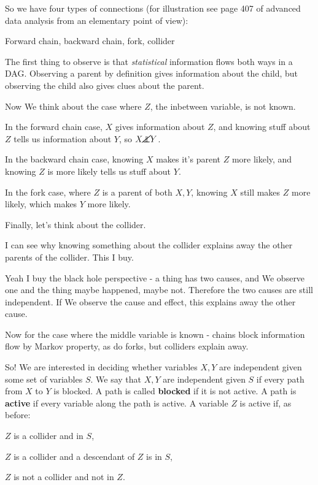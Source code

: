 \documentclass{article}
\newcommand\independent{\protect\mathpalette{\protect\independenT}{\perp}}
\def\independenT#1#2{\mathrel{\rlap{$#1#2$}\mkern2mu{#1#2}}}
\begin{document}
		So we have four types of connections (for illustration see page 407 of advanced data analysis from an elementary point of view):
		
		Forward chain, backward chain, fork, collider
		
		The first thing to observe is that \textit{statistical} information flows both ways in a DAG. Observing a parent by definition gives information about the child, but observing the child also gives clues about the parent.
		
		Now We think about the case where $Z$, the inbetween variable, is not known.
		
		In the forward chain case, $X$ gives information about $Z$, and knowing stuff about $Z$ tells us information about $Y$, so $X \cancel{\independent} Y$.
		
		In the backward chain case, knowing $X$ makes it's parent $Z$ more likely, and knowing $Z$ is more likely tells us stuff about $Y$.
		
		In the fork case, where $Z$ is a parent of both $X, Y$, knowing $X$ still makes $Z$ more likely, which makes $Y$ more likely.
		
		 Finally, let's think about the collider. 
		 
		 I can see why knowing something about the collider explains away the other parents of the collider. This I buy.
		 
		 Yeah I buy the black hole perspective - a thing has two causes, and We observe one and the thing maybe happened, maybe not. Therefore the two causes are still independent. If We observe the cause and effect, this explains away the other cause. 
		 
		 Now for the case where the middle variable is known - chains block information flow by Markov property, as do forks, but colliders explain away. 
		 
		 So! We are interested in deciding whether variables $X, Y$ are independent given some set of variables $S$. We say that $X, Y$ are independent given $S$ if every path from $X$ to $Y$ is blocked. A path is called \textbf{blocked} if it is not active. A path is \textbf{active} if every variable along the path is active. A variable $Z$ is active if, as before:
		 
		 $Z$ is a collider and in $S$,
		 
		 $Z$ is a collider and a descendant of $Z$ is in $S$,
		 
		 $Z$ is not a collider and not in $Z$.
		 
\end{document}
